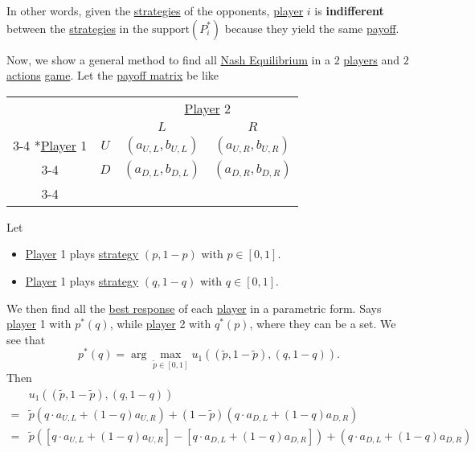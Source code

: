 \begin{intuition}
	In other words, given the \hyperref[def:strategy]{strategies} of the opponents, \hyperref[def:player]{player} \(i\) is \textbf{indifferent} between the
	\hyperref[def:strategy]{strategies} in the \(\mathrm{support}(P_{i}^{\ast}) \) because they yield the same \hyperref[def:reward]{payoff}.
\end{intuition}

Now, we show a general method to find all \hyperref[def:Nash-equilibrium]{Nash Equilibrium} in a \(2\) \hyperref[def:player]{players} and \(2\) \hyperref[def:strategy]{actions}
\hyperref[def:game]{game}. Let the \hyperref[def:payoff-matrix]{payoff matrix} be like
\begin{table}[H]
	\centering
	\setlength{\extrarowheight}{2pt}
	\begin{tabular}{cc|c|c|}
		                                               & \multicolumn{1}{c}{} & \multicolumn{2}{c}{\hyperref[def:player]{Player} 2}                           \\
		                                               & \multicolumn{1}{c}{} & \multicolumn{1}{c}{$L$}                             & \multicolumn{1}{c}{$R$} \\\cline{3-4}
		\multirow{2}*{\hyperref[def:player]{Player} 1} & $U$                  & $(a_{U, L}, b_{U, L})$                              & $(a_{U, R}, b_{U, R})$  \\\cline{3-4}
		                                               & $D$                  & $(a_{D, L}, b_{D, L})$                              & $(a_{D, R}, b_{D, R})$  \\\cline{3-4}
	\end{tabular}
\end{table}
Let
\begin{itemize}
	\item \hyperref[def:player]{Player} 1 plays \hyperref[def:strategy]{strategy} \((p, 1 - p)\) with \(p\in \left[0, 1\right]\).
	\item \hyperref[def:player]{Player} 1 plays \hyperref[def:strategy]{strategy} \((q, 1 - q)\) with \(q\in \left[0, 1\right]\).
\end{itemize}
We then find all the \hyperref[def:best-response]{best response} of each \hyperref[def:player]{player} in a parametric form.
Says \hyperref[def:player]{player} 1 with \(p^{\ast}(q)\), while \hyperref[def:player]{player} 2 with \(q^{\ast}(p)\), where they can be a set. We see that
\[
	p^{\ast}(q) = \arg\max_{\widetilde{p}\in\left[0, 1\right]}u_1\left((\widetilde{p}, 1 - \widetilde{p}), (q, 1 - q)\right).
\]
Then
\[
	\begin{split}
		&u_1\left((\widetilde{p}, 1 - \widetilde{p}), (q, 1 - q)\right) \\
		= &\widetilde{p}\left(q\cdot a_{U, L} + (1 - q)a_{U, R}\right)+(1 - \widetilde{p})\left(q\cdot a_{D, L}+(1 - q)a_{D, R}\right)\\
		= &\widetilde{p}\left(\left[q\cdot a_{U, L}+(1 - q)a_{U, R}\right] - \left[q\cdot a_{D, L} + (1 - q)a_{D, R}\right]\right)+\left(q\cdot a_{D, L}+(1 - q)a_{D, R}\right)
	\end{split}
\]

